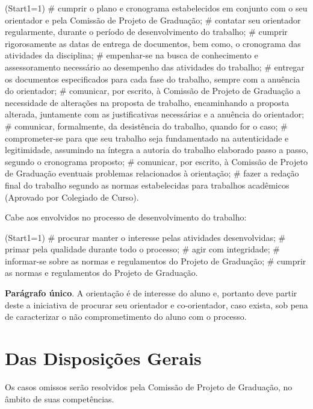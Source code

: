\documentclass[12pt,geral,titlewithdate]{uftdocs}
\begin{document}
\begin{easylist}\ListProperties(Start1=1)
# cumprir o plano e cronograma estabelecidos em conjunto com o seu orientador e pela Comissão de Projeto de Graduação;
# contatar seu orientador regularmente, durante o período de desenvolvimento do trabalho;
# cumprir rigorosamente as datas de entrega de documentos, bem como, o cronograma das atividades da disciplina;
# empenhar-se na busca de conhecimento e assessoramento necessário ao desempenho das atividades do trabalho;
# entregar os documentos especificados para cada fase do trabalho, sempre com a anuência do orientador;
# comunicar, por escrito, à Comissão de Projeto de Graduação a necessidade de alterações na proposta de trabalho, encaminhando a proposta alterada, juntamente com as justificativas necessárias e a anuência do orientador;
# comunicar, formalmente, da desistência do trabalho, quando for o caso;
# comprometer-se para que seu trabalho seja fundamentado na autenticidade e legitimidade, assumindo na íntegra a autoria do trabalho elaborado passo a passo, segundo o cronograma proposto;
# comunicar, por escrito, à Comissão de Projeto de Graduação eventuais problemas relacionados à orientação;
# fazer a redação final do trabalho segundo as normas estabelecidas para trabalhos acadêmicos (Aprovado por Colegiado de Curso).
\end{easylist}

\artigo Cabe aos envolvidos no processo de desenvolvimento do trabalho:

\begin{easylist}\ListProperties(Start1=1)
# procurar manter o interesse pelas atividades desenvolvidas;
# primar pela qualidade durante todo o processo;
# agir com integridade;
# informar-se sobre as normas e regulamentos do Projeto de Graduação;
# cumprir as normas e regulamentos do Projeto de Graduação.
\end{easylist}

{\bf Parágrafo único}. A orientação é de interesse do aluno e, portanto deve partir deste a iniciativa de procurar seu orientador e co-orientador, caso exista, sob pena de caracterizar o não comprometimento do aluno com o processo. 

\chapter{Das Disposições Gerais}

\artigo Os casos omissos serão resolvidos pela Comissão de Projeto de Graduação, no âmbito de suas competências. 

\addtocounter{artigo}{100}
\end{document}
